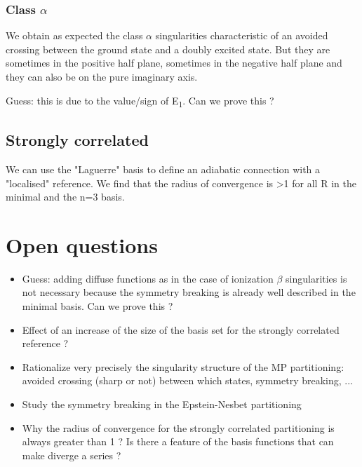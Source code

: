 \documentclass{article}
\begin{document}
\subsubsection{Class $\alpha$}

We obtain as expected the class $\alpha$ singularities characteristic of an avoided crossing between the ground state and a doubly excited state. But they are sometimes in the positive half plane, sometimes in the negative half plane and they can also be on the pure imaginary axis.

Guess: this is due to the value/sign of E\textsubscript{1}. Can we prove this ?

\subsection{Strongly correlated}

We can use the "Laguerre" basis to define an adiabatic connection with a "localised" reference. We find that the radius of convergence is >1 for all R in the minimal and the n=3 basis. 

\section{Open questions}

\begin{itemize}
\item Guess: adding diffuse functions as in the case of ionization $\beta$ singularities is not necessary because the symmetry breaking is already well described in the minimal basis. Can we prove this ?
\item Effect of an increase of the size of the basis set for the strongly correlated reference ?
\item Rationalize very precisely the singularity structure of the MP partitioning: avoided crossing (sharp or not) between which states, symmetry breaking, ...
\item Study the symmetry breaking in the Epstein-Nesbet partitioning
\item Why the radius of convergence for the strongly correlated partitioning is always greater than 1 ? Is there a feature of the basis functions that can make diverge a series ?

\end{itemize}
\end{document}
